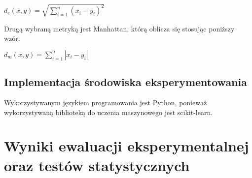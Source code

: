 \begin{center}
    \begin{math}
        d_{e}\left( x,y\right)   = \sqrt {\sum _{i=1}^{n}  \left( x_{i}-y_{i}\right)^2 }
    \end{math}
\end{center}

Drugą wybraną metryką jest Manhattan, którą oblicza się stosując poniższy wzór.

\begin{center}
    \begin{math}
        d_{m}\left( x,y\right)   = \sum_{i=1}^n |x_i-y_i|
    \end{math}
\end{center}



\subsection{Implementacja środowiska eksperymentowania}
Wykorzystywanym językiem programowania jest Python, ponieważ wykorzystywaną biblioteką do uczenia maszynowego jest scikit-learn\cite{scikit}.

\section{Wyniki ewaluacji eksperymentalnej oraz testów statystycznych}
